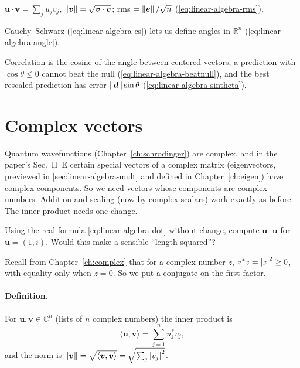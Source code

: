 \begin{keyideas}
\item $\bm u\cdot\bm v=\sum_ju_jv_j$, $\left\lVert \bm v\right\rVert=\sqrt{\bm v\cdot\bm v}$; rms $=\left\lVert \bm e\right\rVert/\sqrt n$ (\cref{eq:linear-algebra-rms}).
\item Cauchy--Schwarz (\cref{eq:linear-algebra-cs}) lets us define angles in $\mathbb R^n$ (\cref{eq:linear-algebra-angle}).
\item Correlation is the cosine of the angle between centered vectors; a prediction with $\cos\theta\le0$ cannot beat the null (\cref{eq:linear-algebra-beatnull}), and the best rescaled prediction has error $\left\lVert \bm d\right\rVert\sin\theta$ (\cref{eq:linear-algebra-sintheta}).
\end{keyideas}

\section{Complex vectors}\label{sec:linear-algebra-complex}

Quantum wavefunctions (Chapter~\ref{ch:schrodinger}) are complex, and in the paper's Sec.~II~E certain special vectors of a complex matrix (eigenvectors, previewed in \cref{sec:linear-algebra-mult} and defined in Chapter~\ref{ch:eigen}) have complex components. So we need vectors whose components are complex numbers. Addition and scaling (now by complex scalars) work exactly as before. The inner product needs one change.

\begin{checkpoint}
Using the real formula \cref{eq:linear-algebra-dot} without change, compute $\bm u\cdot\bm u$ for $\bm u=(1,i)$. Would this make a sensible ``length squared''?
\end{checkpoint}

Recall from Chapter~\ref{ch:complex} that for a complex number $z$, $z^*z=\left\lvert z\right\rvert^2\ge0$, with equality only when $z=0$. So we put a conjugate on the first factor.

\paragraph{Definition.} For $\bm u,\bm v\in\mathbb C^n$ (lists of $n$ complex numbers) the inner product is
\begin{equation}
\langle\bm u,\bm v\rangle=\sum_{j=1}^nu_j^*v_j ,
\label{eq:linear-algebra-cinner}
\end{equation}
and the norm is $\left\lVert \bm v\right\rVert=\sqrt{\langle\bm v,\bm v\rangle}=\sqrt{\sum_j\left\lvert v_j\right\rvert^2}$.

